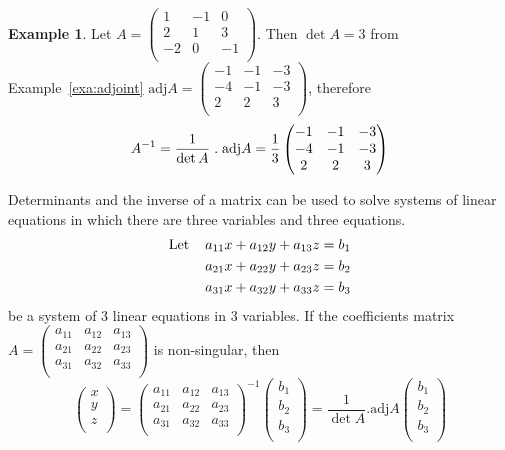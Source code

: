 \documentclass[11pt,a4paper]{article}
\theoremstyle{definition}
\newtheorem{exa}[thm]{Example}
\begin{document}
\begin{exa}\label{exa:inverse-adj}
Let $A=
\begin{pmatrix}
1&-1&0\\2&1&3\\-2&0&-1\\
\end{pmatrix}
$. Then $\det A=3$ from Example~\ref{exa:adjoint} $\text{adj}A=
\begin{pmatrix}
-1&-1&-3\\-4&-1&-3\\2&2&3\\
\end{pmatrix}
$, therefore
$$A^{-1}=\frac{1}{\det A}\hspace{0.1cm}.\hspace{0.1cm}\text{adj}A=\frac{1}{3}
\begin{pmatrix}
-1&-1&-3\\-4&-1&-3\\2&2&3\\
\end{pmatrix}
$$


Determinants and the inverse of a matrix can be used to solve systems of linear equations in which there are three variables and three equations.
\begin{align*}
\text{Let}\hspace{0.4cm} a_{11}x+a_{12}y+a_{13}z &=b_1\\
a_{21}x+a_{22}y+a_{23}z&=b_2\\ a_{31}x+a_{32}y+a_{33}z&=b_3
\end{align*}
be a system of 3 linear equations in 3 variables. If the coefficients matrix $A=
\begin{pmatrix}
a_{11}&a_{12}&a_{13}\\a_{21}&a_{22}&a_{23}\\a_{31}&a_{32}&a_{33}\\
\end{pmatrix}
$ is non-singular, then $$
\begin{pmatrix}
x\\y\\z\\
\end{pmatrix}
=
\begin{pmatrix}
a_{11}&a_{12}&a_{13}\\a_{21}&a_{22}&a_{23}\\a_{31}&a_{32}&a_{33}\\
\end{pmatrix}^{-1}
\begin{pmatrix}
b_1\\b_2\\b_3\\
\end{pmatrix}
=\frac{1}{\det A}.\text{adj}A
\begin{pmatrix}
b_1\\b_2\\b_3\\
\end{pmatrix}
$$
\end{exa}
\end{document}
